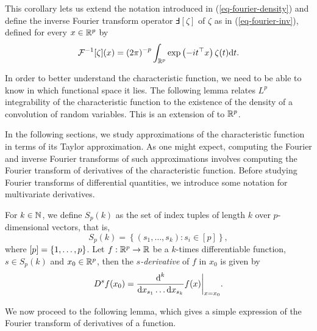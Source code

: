 This corollary lets us extend the notation introduced in (\ref{eq-fourier-density}) and define the inverse Fourier transform operator $\Finv[\zeta]$ of $\zeta$ as in (\ref{eq-fourier-inv}), defined for every $x \in {\mathbb{R}^p}$ by
\begin{equation*}
    {\mathcal{F}^{-1}}[\zeta](x) = \left(2\pi\right)^{-p}\int_{\mathbb{R}^p} \exp\left(-i t^\top x\right) \zeta(t) \text{d} t.
\end{equation*}

In order to better understand the characteristic function, we need to be able to know in which functional space it lies. The following lemma relates $L^p$ integrability of the characteristic function to the existence of the density of a convolution of random variables. This is an extension of \cite[Lemma 2.4.4]{kolassa2006series} to ${\mathbb{R}^p}$.



In the following sections, we study approximations of the characteristic function in terms of its Taylor approximation. As one might expect, computing the Fourier and inverse Fourier transforms of such approximations involves computing the Fourier transform of derivatives of the characteristic function. Before studying Fourier transforms of differential quantities, we introduce some notation for multivariate derivatives.

For $k \in \mathbb{N}$, we define $S_p(k)$ as the set of index tuples of length $k$ over $p$-dimensional vectors, that is,
\begin{equation*}
    S_p(k) = \left\{ (s_1, \ldots, s_k) : s_i \in [p] \right\},
\end{equation*}
where $[p] = {\left\{1, \ldots, p\right\}}$. Let $f : {\mathbb{R}^p} \rightarrow \mathbb{R}$ be a $k$-times differentiable function, $s \in S_p(k)$ and $x_0 \in {\mathbb{R}^p}$, then the \textit{$s$-derivative} of $f$ in $x_0$ is given by
\begin{equation*}
    D^s f(x_0) = \frac{\text{d}^k}{\text{d} x_{s_1} \ldots \text{d} x_{s_k}} f(x) \bigg|_{x=x_0}.
\end{equation*}

We now proceed to the following lemma, which gives a simple expression of the Fourier transform of derivatives of a function.

